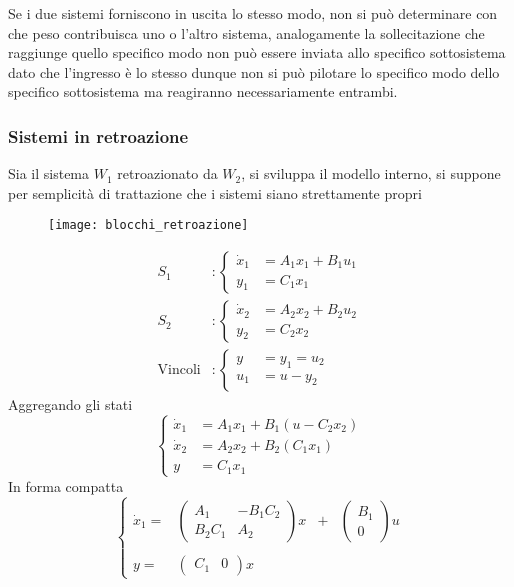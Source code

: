 Se i due sistemi forniscono in uscita lo stesso modo, non si può determinare
con che peso contribuisca uno o l'altro sistema, analogamente la sollecitazione
che raggiunge quello specifico modo non può essere inviata allo specifico
sottosistema dato che l'ingresso è lo stesso dunque non si può pilotare lo
specifico modo dello specifico sottosistema ma reagiranno necessariamente
entrambi.

\subsubsection{Sistemi in retroazione}
Sia il sistema $W_1$ retroazionato da $W_2$,
si sviluppa il modello interno, si suppone per semplicità di trattazione che i
sistemi siano strettamente propri
\begin{figure}[h]
\centering
\texttt{[image: blocchi\_retroazione]}
\end{figure}
$$
\begin{aligned}
S_1 &: \left\{\begin{aligned}
\dot{x}_1 & = A_1x_1 + B_1u_1\\
y_1 &= C_1 x_1
\end{aligned}\right. \\
S_2 & : \left\{\begin{aligned}
\dot{x}_2 & = A_2x_2 + B_2u_2\\
y_2 &= C_2 x_2
\end{aligned}\right. \\
\text{Vincoli} &: \left\{\begin{aligned}
y&=y_1=u_2\\
u_1 &= u -y_2
\end{aligned}\right.
\end{aligned}
$$
Aggregando gli stati
$$
\left\{\begin{aligned}
\dot{x}_1 & = A_1x_1 + B_1(u-C_2x_2)\\
\dot{x}_2 &= A_2x_2 + B_2(C_1x_1) \\
y &= C_1x_1
\end{aligned}\right.
$$
In forma compatta
$$
\left\{\begin{array}{cccc}
\dot{x}_1 =& \begin{pmatrix}
A_1 & -B_1C_2 \\ B_2C_1 & A_2
\end{pmatrix}x& +& \begin{pmatrix}
B_1 \\ 0
\end{pmatrix}u\\ \\
y =& \begin{pmatrix}
C_1 & 0
\end{pmatrix}x
\end{array}\right.
$$

